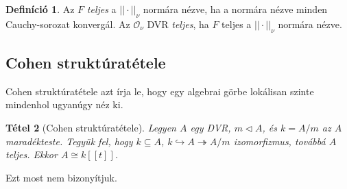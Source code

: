 \documentclass[11pt,a4paper]{article}
\newtheorem{tetel}{Tétel}[section]
\theoremstyle{definition}
\newtheorem{definicio}[tetel]{Definíció}
\newcommand{\OO}{\mathcal O}
\begin{document}
\begin{definicio}
Az $F$ {\it teljes} a $||\cdot ||_{\nu}$ normára nézve, ha a normára nézve minden Cauchy-sorozat konvergál. Az $\OO_{\nu}$ DVR {\it teljes}, ha $F$ teljes a $||\cdot ||_{\nu}$ normára nézve.
\end{definicio}

\subsection{Cohen struktúratétele}

Cohen struktúratétele azt írja le, hogy egy algebrai görbe lokálisan szinte mindenhol ugyanúgy néz ki.

\begin{tetel}[Cohen struktúratétele]
Legyen $A$ egy DVR, $m\triangleleft A$, és $k=A/m$ az $A$ maradékteste. Tegyük fel, hogy $k\subseteq A$, $k\hookrightarrow A\twoheadrightarrow A/m$ izomorfizmus, továbbá $A$ teljes. Ekkor $A\cong k[[t]]$.
\end{tetel}

Ezt most nem bizonyítjuk.
\end{document}
